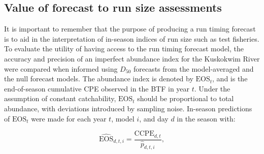\documentclass[12pt,]{book}
\theoremstyle{definition}
\theoremstyle{definition}
\theoremstyle{definition}
\theoremstyle{remark}
\begin{document}
\subsection{Value of forecast to run size assessments}\label{eos-preds}

\noindent
It is important to remember that the purpose of producing a run timing
forecast is to aid in the interpretation of in-season indices of run
size such as test fisheries. To evaluate the utility of having access to
the run timing forecast model, the accuracy and precision of an
imperfect abundance index for the Kuskokwim River were compared when
informed using \(D_{50}\) forecasts from the model-averaged and the null
forecast models. The abundance index is denoted by \(\text{EOS}_t\), and
is the end-of-season cumulative CPE observed in the BTF in year \(t\).
Under the assumption of constant catchability, \(\text{EOS}_t\) should
be proportional to total abundance, with deviations introduced by
sampling noise. In-season predictions of \(\text{EOS}_t\) were made for
each year \(t\), model \(i\), and day \(d\) in the season with:

\begin{equation}
  \widehat{\text{EOS}}_{d,t,i}=\frac{\text{CCPE}_{d,t}}{\hat{p}_{d,t,i}},
\label{eq:eos}
\end{equation}
\end{document}
